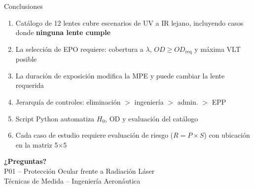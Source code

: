\documentclass[aspectratio=169,12pt]{beamer}
\begin{document}
\begin{frame}{Conclusiones}
	\begin{enumerate}
		\item Catálogo de 12 lentes cubre escenarios de UV a IR lejano,
		      incluyendo casos donde \textbf{ninguna lente cumple}
		\item La selección de EPO requiere: cobertura a $\lambda$,
		      $OD \ge OD_{\mathrm{req}}$ y máxima VLT posible
		\item La duración de exposición modifica la MPE y puede cambiar
		      la lente requerida
		\item Jerarquía de controles: eliminación $>$ ingeniería $>$ admin. $>$ EPP
		\item Script Python automatiza $H_0$, OD y evaluación del catálogo
		\item Cada caso de estudio requiere evaluación de riesgo ($R = P \times S$)
		      con ubicación en la matriz 5$\times$5
	\end{enumerate}

	\vspace{0.5cm}
	\centering
\end{frame}

\begin{frame}{}
	\centering
	\vspace{2cm}
	{\Huge\color{aerogreen}\bfseries ¿Preguntas?}\\[1cm]
	{\large P01 -- Protección Ocular frente a Radiación Láser}\\[0.5cm]
	{\small Técnicas de Medida -- Ingeniería Aeronáutica}
\end{frame}
\end{document}
